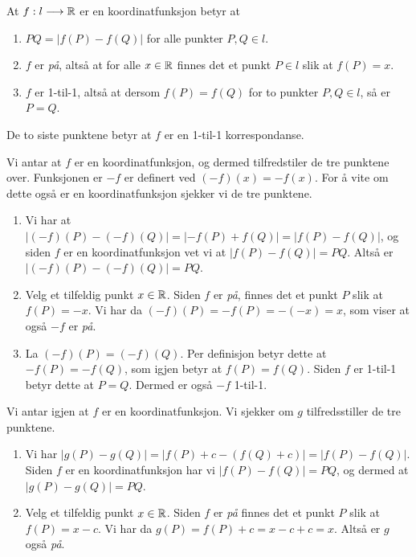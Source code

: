 

\begin{oppgave}[3.2.12]
  At $f:l\longrightarrow \mathbb{R}$ er en koordinatfunksjon betyr at 
  \begin{enumerate}
      \item $PQ=|f(P)-f(Q)|$ for alle punkter $P, Q\in l$. 
      
      \item $f$ er \emph{på}, altså at for alle $x\in \mathbb{R}$ finnes det et punkt $P\in l$ 
      slik at $f(P)=x$.
      
      \item $f$ er 1-til-1, altså at dersom $f(P)=f(Q)$ for to punkter $P, Q\in l$, så
      er $P=Q$. 
  \end{enumerate}
  De to siste punktene betyr at $f$ er en 1-til-1 korrespondanse. 

  \begin{punkt}
    Vi antar at $f$ er en koordinatfunksjon, og dermed tilfredstiler de tre punktene over. 
    Funksjonen er $-f$ er definert ved $(-f)(x)=-f(x)$. For å vite om dette også er en 
    koordinatfunksjon sjekker vi de tre punktene. 
    \begin{enumerate}
        \item Vi har at $|(-f)(P)-(-f)(Q)|=|-f(P)+f(Q)|=|f(P)-f(Q)|$, og siden $f$ er en 
        koordinatfunksjon vet vi at $|f(P)-f(Q)|=PQ$. Altså er $|(-f)(P)-(-f)(Q)| =PQ$. 
        
        \item Velg et tilfeldig punkt $x\in \mathbb{R}$. Siden $f$ er \emph{på}, finnes det et 
        punkt $P$ slik at $f(P)=-x$. Vi har da $(-f)(P) = -f(P)=-(-x)=x$, som viser at 
        også $-f$ er \emph{på}.
        
        \item La $(-f)(P)=(-f)(Q)$. Per definisjon betyr dette at $-f(P)=-f(Q)$, som igjen
        betyr at $f(P)=f(Q)$. Siden $f$ er 1-til-1 betyr dette at $P=Q$. Dermed er også $-f$
        1-til-1. 
    \end{enumerate}
  \end{punkt}

  \begin{punkt}
    Vi antar igjen at $f$ er en koordinatfunksjon. Vi sjekker om $g$ tilfredsstiller de 
    tre punktene. 
    \begin{enumerate}
        \item Vi har $|g(P)-g(Q)|=|f(P)+c - (f(Q)+c)|=|f(P)-f(Q)|$. Siden $f$ er en 
        koordinatfunksjon har vi $|f(P)-f(Q)|=PQ$, og dermed at $|g(P)-g(Q)|=PQ$. 
        \item Velg et tilfeldig punkt $x\in \mathbb{R}$. Siden $f$ er \emph{på} finnes det et 
        punkt $P$ slik at $f(P)=x-c$. Vi har da $g(P)=f(P)+c = x-c+c = x$. Altså er 
        $g$ også \emph{på}. 
        

\end{enumerate}
\end{punkt}
\end{oppgave}
